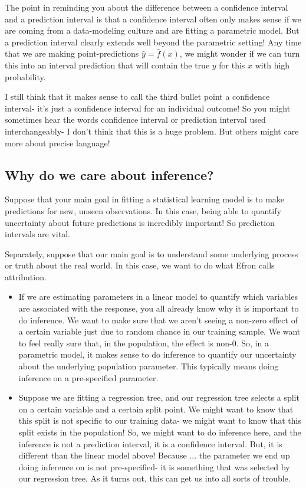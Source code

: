 The point in reminding you about the difference between a confidence interval and a prediction interval is that a confidence interval often only makes sense if we are coming from a data-modeling culture and are fitting a parametric model. But a prediction interval clearly extends well beyond the parametric setting! Any time that we are making point-predictions $\hat{y} = \hat{f}(x)$, we might wonder if we can turn this into an interval prediction that will contain the true $y$ for this $x$ with high probability. 

I still think that it makes sense to call the third bullet point a confidence interval- it's just a confidence interval for an individual outcome! So you might sometimes hear the words confidence interval or prediction interval used interchangeably- I don't think that this is a huge problem. But others might care more about precise language!
 

\subsection{Why do we care about inference?}

Suppose that your main goal in fitting a statistical learning model is to make predictions for new, unseen observations. In this case, being able to quantify uncertainty about future predictions is incredibly important! So prediction intervals are vital. 

Separately, suppose that our main goal is to understand some underlying process or truth about the real world. In this case, we want to do what Efron calls attribution. 
\begin{itemize}
\item If we are estimating parameters in a linear model to quantify which variables are associated with the response, you all already know why it is important to do inference. We want to make sure that we aren't seeing a non-zero effect of a certain variable just due to random chance in our training sample. We want to feel really sure that, in the population, the effect is non-0. So, in a parametric model, it makes sense to do inference to quantify our uncertainty about the underlying population parameter.  This typically means doing inference on a pre-specified parameter. 
\item Suppose we are fitting a regression tree, and our regression tree selects a split on a certain variable and a certain split point. We might want to know that this split is not specific to our training data- we might want to know that this split exists in the population! So, we might want to do inference here, and the inference is not a prediction interval, it is a confidence interval. But, it is different than the linear model above! Because ... the parameter we end up doing inference on is not pre-specified- it is something that was selected by our regression tree. As it turns out, this can get us into all sorts of trouble. 
\end{itemize}


